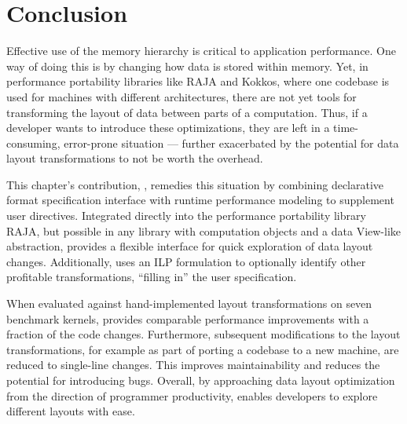 \section{Conclusion}


Effective use of the memory hierarchy is critical to application performance.
One way of doing this is by changing how data is stored within memory.
Yet, in performance portability libraries like RAJA and Kokkos, where one codebase is used for machines with different architectures, there are not yet tools for transforming the layout of data between parts of a computation. 
Thus, if a developer wants to introduce these optimizations, they are left in a time-consuming, error-prone situation --- further exacerbated by the potential for data layout transformations to not be worth the overhead.

This chapter's contribution, \FormatDecisions, remedies this situation by combining declarative format specification  interface with runtime performance modeling to supplement user directives.
Integrated directly into the performance portability library RAJA, but possible in any library with computation objects and a data View-like abstraction, \FormatDecisions{} provides a flexible interface for quick exploration of data layout changes. 
Additionally, \FormatDecisions{} uses an ILP formulation to optionally identify other profitable transformations, \enquote{filling in} the user specification.

When evaluated against hand-implemented layout transformations on seven benchmark kernels, \FormatDecisions{} provides comparable performance improvements with a fraction of the code changes.
Furthermore, subsequent modifications to the layout transformations, for example as part of porting a codebase to a new machine, are reduced to single-line changes. 
This improves maintainability and reduces the potential for introducing bugs.
Overall, by approaching data layout optimization from the direction of programmer productivity, \FormatDecisions{} enables developers to explore different layouts with ease. 



